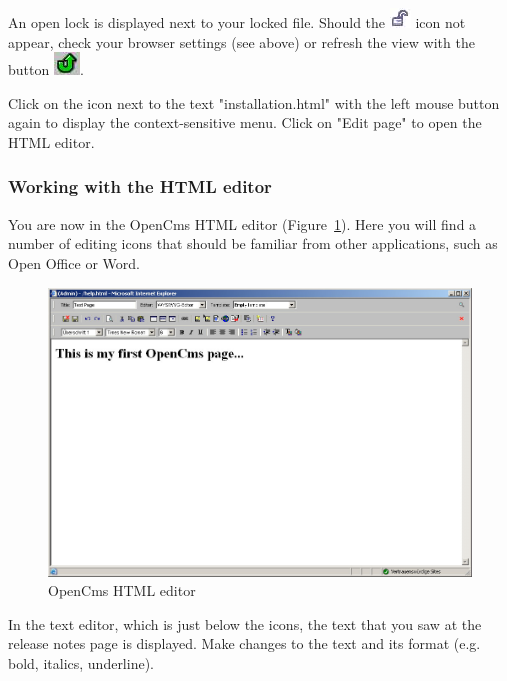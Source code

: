 An open lock is displayed next to your locked file. Should the
\includegraphics{pics/usermanual/ic_locked}
icon not appear, check your browser settings (see above) or
refresh the view with the button
\includegraphics{pics/usermanual/ic_refresh}.

Click on the icon next to the text "installation.html" with the left
mouse button again to display the context-sensitive menu. Click on
"Edit page" to open the HTML editor.

\subsubsection{Working with the HTML editor}

You are now in the OpenCms HTML editor (Figure~\ref{htmleditor}).
Here you will find a number of editing icons that should be
familiar from other applications, such as Open Office or Word.

\begin{figure}[!hbt]
\begin{center}
\includegraphics[width=\sgw]
                   {pics/usermanual/htmlEditor}
\caption[OpenCms HTML editor]
           {OpenCms HTML editor}
\label{htmleditor}
\end{center}
\end{figure}

In the text editor, which is just below the icons, the text that
you saw at the release notes page is
displayed. Make changes to the text and its format (e.g. bold, italics,
underline).

